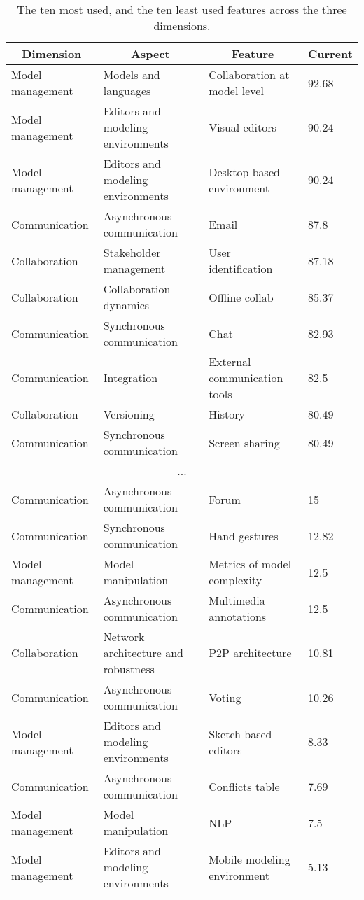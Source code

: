 
  \begin{table*}[]
  \centering
  \notsotiny
  \caption{ The ten most used, and the ten least used features across the three dimensions.}
\label{tab:top-bottom-current}
\begin{tabular}{@{}llll@{}}
  \toprule
\multicolumn{1}{c}{\textbf{Dimension}} & \multicolumn{1}{c}{\textbf{Aspect}} & \multicolumn{1}{c}{\textbf{Feature}} & \multicolumn{1}{c}{\textbf{Current}} \\ 

  \midrule
  Model management & Models and languages & Collaboration at model level & 92.68 \\ 
Model management & Editors and modeling environments & Visual editors & 90.24 \\ 
Model management & Editors and modeling environments & Desktop-based environment & 90.24 \\ 
Communication & Asynchronous communication & Email & 87.8 \\ 
Collaboration & Stakeholder management & User identification & 87.18 \\ 
Collaboration & Collaboration dynamics & Offline collab & 85.37 \\ 
Communication & Synchronous communication & Chat & 82.93 \\ 
Communication & Integration & External communication tools & 82.5 \\ 
Collaboration & Versioning & History & 80.49 \\ 
Communication & Synchronous communication & Screen sharing & 80.49 \\ 
\multicolumn{4}{c}{...} \\ 
Communication & Asynchronous communication & Forum & 15 \\ 
Communication & Synchronous communication & Hand gestures & 12.82 \\ 
Model management & Model manipulation & Metrics of model complexity & 12.5 \\ 
Communication & Asynchronous communication & Multimedia annotations & 12.5 \\ 
Collaboration & Network architecture and robustness & P2P architecture & 10.81 \\ 
Communication & Asynchronous communication & Voting & 10.26 \\ 
Model management & Editors and modeling environments & Sketch-based editors & 8.33 \\ 
Communication & Asynchronous communication & Conflicts table & 7.69 \\ 
Model management & Model manipulation & NLP & 7.5 \\ 
Model management & Editors and modeling environments & Mobile modeling environment & 5.13 \\ 
\bottomrule
  \end{tabular}%
  \end{table*}